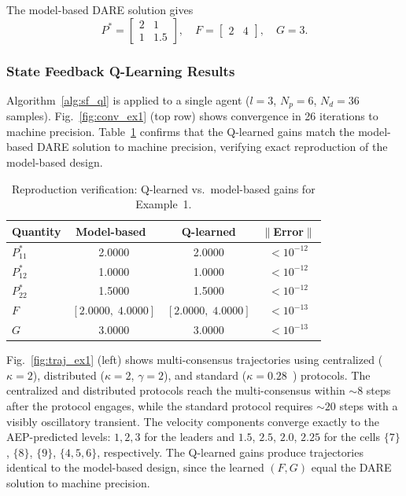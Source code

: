 \documentclass[final,5p,times]{elsarticle}
\theoremstyle{plain}
\theoremstyle{definition}
\theoremstyle{remark}
\begin{document}
The model-based DARE solution gives
\begin{equation*}
P^* = \begin{bmatrix} 2 & 1 \\ 1 & 1.5 \end{bmatrix}, \quad
F = \begin{bmatrix} 2 & 4 \end{bmatrix}, \quad G = 3.
\end{equation*}
\subsubsection{State Feedback Q-Learning Results}
Algorithm~\ref{alg:sf_ql} is applied to a single agent ($l = 3$, $N_p = 6$, $N_d = 36$ samples). Fig.~\ref{fig:conv_ex1} (top row) shows convergence in 26 iterations to machine precision. Table~\ref{tab:reproduction} confirms that the Q-learned gains match the model-based DARE solution to machine precision, verifying exact reproduction of the model-based design.
\begin{table}[htbp]
\centering
\caption{Reproduction verification: Q-learned vs.\ model-based gains for Example~1.}
\label{tab:reproduction}
\small
\begin{tabular}{lccc}
\toprule
Quantity & Model-based~\cite{cacace2024} & Q-learned & $\|$Error$\|$ \\
\midrule
$P^*_{11}$ & 2.0000 & 2.0000 & $<10^{-12}$ \\
$P^*_{12}$ & 1.0000 & 1.0000 & $<10^{-12}$ \\
$P^*_{22}$ & 1.5000 & 1.5000 & $<10^{-12}$ \\
$F$ & $[2.0000,\; 4.0000]$ & $[2.0000,\; 4.0000]$ & $<10^{-13}$ \\
$G$ & 3.0000 & 3.0000 & $<10^{-13}$ \\
\bottomrule
\end{tabular}
\end{table}

Fig.~\ref{fig:traj_ex1} (left) shows multi-consensus trajectories using centralized ($\kappa = 2$), distributed ($\kappa = 2$, $\gamma = 2$), and standard ($\kappa = 0.28$~\cite{ma2015}) protocols. The centralized and distributed protocols reach the multi-consensus within ${\sim}8$ steps after the protocol engages, while the standard protocol requires ${\sim}20$ steps with a visibly oscillatory transient. The velocity components converge exactly to the AEP-predicted levels: $1, 2, 3$ for the leaders and $1.5$, $2.5$, $2.0$, $2.25$ for the cells $\{7\}$, $\{8\}$, $\{9\}$, $\{4,5,6\}$, respectively. The Q-learned gains produce trajectories identical to the model-based design, since the learned $(F,G)$ equal the DARE solution to machine precision.
\end{document}
